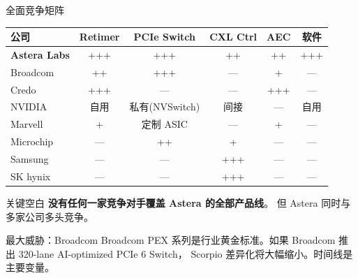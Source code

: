 \documentclass[aspectratio=169, 10pt, UTF8]{ctexbeamer}
\begin{document}
\begin{frame}{全面竞争矩阵}
  \begin{table}[h]
    \centering
    \footnotesize
    \begin{tabular}{lccccc}
      \toprule
      \textbf{公司} & \textbf{Retimer} & \textbf{PCIe Switch} & \textbf{CXL Ctrl} & \textbf{AEC} & \textbf{软件} \\
      \midrule
      \rowcolor{ieeeBlue!12}
      \textbf{Astera Labs} & +++ & +++ & ++ & ++ & +++ \\
      Broadcom & ++ & +++ & — & + & — \\
      Credo & +++ & — & — & +++ & — \\
      NVIDIA & 自用 & 私有(NVSwitch) & 间接 & — & 自用 \\
      Marvell & + & 定制 ASIC & — & + & — \\
      Microchip & — & ++ & + & — & — \\
      Samsung & — & — & +++ & — & — \\
      SK hynix & — & — & +++ & — & — \\
      \bottomrule
    \end{tabular}
  \end{table}

  \begin{exampleblock}{关键空白}
    \textbf{没有任何一家竞争对手覆盖 Astera 的全部产品线}。
    但 Astera 同时与多家公司多头竞争。
  \end{exampleblock}

  \begin{alertblock}{最大威胁：Broadcom}
    Broadcom PEX 系列是行业黄金标准。如果 Broadcom 推出 320-lane AI-optimized PCIe 6 Switch，
    Scorpio 差异化将大幅缩小。时间线是主要变量。
  \end{alertblock}
\end{frame}
\end{document}
